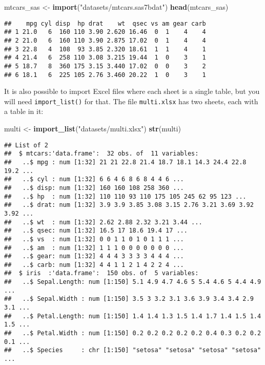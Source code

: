 \documentclass[
]{article}
\newenvironment{Shaded}{\begin{snugshade}}{\end{snugshade}}
\newcommand{\KeywordTok}[1]{\textcolor[rgb]{0.13,0.29,0.53}{\textbf{#1}}}
\newcommand{\NormalTok}[1]{#1}
\newcommand{\StringTok}[1]{\textcolor[rgb]{0.31,0.60,0.02}{#1}}
\begin{document}
\begin{Shaded}
\begin{Highlighting}[]
\NormalTok{mtcars\_sas \textless{}{-}}\StringTok{ }\KeywordTok{import}\NormalTok{(}\StringTok{"datasets/mtcars.sas7bdat"}\NormalTok{)}
\KeywordTok{head}\NormalTok{(mtcars\_sas)}
\end{Highlighting}
\end{Shaded}

\begin{verbatim}
##    mpg cyl disp  hp drat    wt  qsec vs am gear carb
## 1 21.0   6  160 110 3.90 2.620 16.46  0  1    4    4
## 2 21.0   6  160 110 3.90 2.875 17.02  0  1    4    4
## 3 22.8   4  108  93 3.85 2.320 18.61  1  1    4    1
## 4 21.4   6  258 110 3.08 3.215 19.44  1  0    3    1
## 5 18.7   8  360 175 3.15 3.440 17.02  0  0    3    2
## 6 18.1   6  225 105 2.76 3.460 20.22  1  0    3    1
\end{verbatim}

It is also possible to import Excel files where each sheet is a single table, but you will need
\texttt{import\_list()} for that. The file \texttt{multi.xlsx} has two sheets, each with a table in it:

\begin{Shaded}
\begin{Highlighting}[]
\NormalTok{multi \textless{}{-}}\StringTok{ }\KeywordTok{import\_list}\NormalTok{(}\StringTok{"datasets/multi.xlsx"}\NormalTok{)}
\KeywordTok{str}\NormalTok{(multi)}
\end{Highlighting}
\end{Shaded}

\begin{verbatim}
## List of 2
##  $ mtcars:'data.frame':  32 obs. of  11 variables:
##   ..$ mpg : num [1:32] 21 21 22.8 21.4 18.7 18.1 14.3 24.4 22.8 19.2 ...
##   ..$ cyl : num [1:32] 6 6 4 6 8 6 8 4 4 6 ...
##   ..$ disp: num [1:32] 160 160 108 258 360 ...
##   ..$ hp  : num [1:32] 110 110 93 110 175 105 245 62 95 123 ...
##   ..$ drat: num [1:32] 3.9 3.9 3.85 3.08 3.15 2.76 3.21 3.69 3.92 3.92 ...
##   ..$ wt  : num [1:32] 2.62 2.88 2.32 3.21 3.44 ...
##   ..$ qsec: num [1:32] 16.5 17 18.6 19.4 17 ...
##   ..$ vs  : num [1:32] 0 0 1 1 0 1 0 1 1 1 ...
##   ..$ am  : num [1:32] 1 1 1 0 0 0 0 0 0 0 ...
##   ..$ gear: num [1:32] 4 4 4 3 3 3 3 4 4 4 ...
##   ..$ carb: num [1:32] 4 4 1 1 2 1 4 2 2 4 ...
##  $ iris  :'data.frame':  150 obs. of  5 variables:
##   ..$ Sepal.Length: num [1:150] 5.1 4.9 4.7 4.6 5 5.4 4.6 5 4.4 4.9 ...
##   ..$ Sepal.Width : num [1:150] 3.5 3 3.2 3.1 3.6 3.9 3.4 3.4 2.9 3.1 ...
##   ..$ Petal.Length: num [1:150] 1.4 1.4 1.3 1.5 1.4 1.7 1.4 1.5 1.4 1.5 ...
##   ..$ Petal.Width : num [1:150] 0.2 0.2 0.2 0.2 0.2 0.4 0.3 0.2 0.2 0.1 ...
##   ..$ Species     : chr [1:150] "setosa" "setosa" "setosa" "setosa" ...
\end{verbatim}
\end{document}
